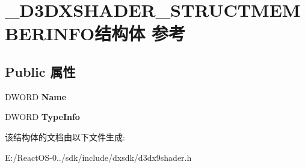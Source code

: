 \hypertarget{struct___d3_d_x_s_h_a_d_e_r___s_t_r_u_c_t_m_e_m_b_e_r_i_n_f_o}{}\section{\+\_\+\+D3\+D\+X\+S\+H\+A\+D\+E\+R\+\_\+\+S\+T\+R\+U\+C\+T\+M\+E\+M\+B\+E\+R\+I\+N\+F\+O结构体 参考}
\label{struct___d3_d_x_s_h_a_d_e_r___s_t_r_u_c_t_m_e_m_b_e_r_i_n_f_o}
\subsection*{Public 属性}
\begin{DoxyCompactItemize}
\item 
\mbox{\label{struct___d3_d_x_s_h_a_d_e_r___s_t_r_u_c_t_m_e_m_b_e_r_i_n_f_o_ac610c8e55ccbb641de5d734a24a58a77}} 
D\+W\+O\+RD {\bfseries Name}
\item 
\mbox{\label{struct___d3_d_x_s_h_a_d_e_r___s_t_r_u_c_t_m_e_m_b_e_r_i_n_f_o_a7a2345a895a952c97e390166c8a166f6}} 
D\+W\+O\+RD {\bfseries Type\+Info}
\end{DoxyCompactItemize}


该结构体的文档由以下文件生成\+:\begin{DoxyCompactItemize}
\item 
E\+:/\+React\+O\+S-\/0../sdk/include/dxsdk/d3dx9shader.\+h\end{DoxyCompactItemize}
